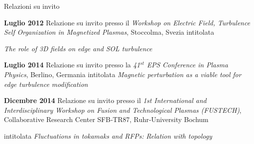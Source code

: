 \begin{statementblock}{Relazioni su invito}
\end{statementblock}
\begin{enumerate}[label={[D\arabic*]}]

\item \textbf{Luglio 2012} Relazione su invito presso il \emph{Workshop on Electric
    Field, Turbulence Self Organization in Magnetized Plasmas},
  Stoccolma, Svezia intitolata {\emph{The role of 3D fields on edge and SOL
    turbulence}

\item \textbf{Luglio 2014} Relazione su invito presso la \emph{41$^{st}$ EPS
    Conference in Plasma Physics}, Berlino, Germania intitolata \emph{Magnetic perturbation as a viable tool for edge
    turbulence modification}

\item \textbf{Dicembre 2014} Relazione su invito presso il \emph{1st
International and Interdisciplinary Workshop on Fusion and Technological Plasmas (FUSTECH)},
Collaborative Research Center SFB‐TR87, Ruhr‐University Bochum}
intitolata \emph{Fluctuations in tokamaks and RFPs: Relation with
  topology}
\end{enumerate}

